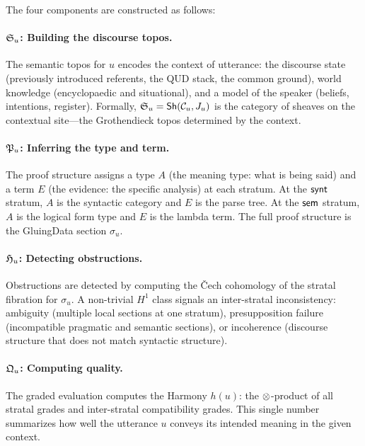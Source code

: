The four components are constructed as follows:

\paragraph{$\mathfrak{S}_u$: Building the discourse topos.}
The semantic topos for $u$ encodes the context of utterance:
the discourse state (previously introduced referents, the QUD stack,
the common ground), world knowledge (encyclopaedic and situational),
and a model of the speaker (beliefs, intentions, register).
Formally, $\mathfrak{S}_u = \mathsf{Sh}(\mathcal{C}_u, J_u)$ is the category of
sheaves on the contextual site---the Grothendieck topos determined
by the context.

\paragraph{$\mathfrak{P}_u$: Inferring the type and term.}
The proof structure assigns a type $A$ (the meaning type: what is
being said) and a term $E$ (the evidence: the specific analysis) at
each stratum.  At the $\mathsf{synt}$ stratum, $A$ is the syntactic category
and $E$ is the parse tree.  At the $\mathsf{sem}$ stratum, $A$ is the logical
form type and $E$ is the lambda term.  The full proof structure is
the GluingData section $\sigma_u$.

\paragraph{$\mathfrak{H}_u$: Detecting obstructions.}
Obstructions are detected by computing the \v{C}ech cohomology of
the stratal fibration for $\sigma_u$.  A non-trivial $H^1$ class
signals an inter-stratal inconsistency: ambiguity (multiple local
sections at one stratum), presupposition failure (incompatible
pragmatic and semantic sections), or incoherence (discourse structure
that does not match syntactic structure).

\paragraph{$\mathfrak{Q}_u$: Computing quality.}
The graded evaluation computes the Harmony $h(u)$: the $\otimes$-product
of all stratal grades and inter-stratal compatibility grades.  This
single number summarizes how well the utterance $u$ conveys its
intended meaning in the given context.

